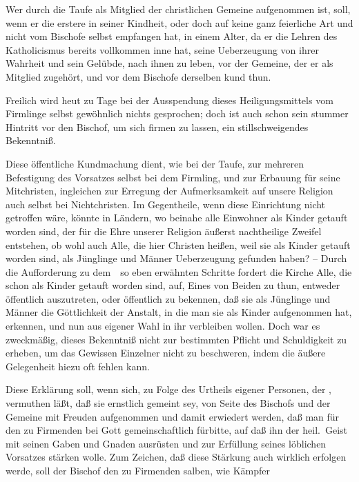 \begin{aufza}
\item Wer durch die Taufe als Mitglied der christlichen Gemeine aufgenommen ist, soll, wenn er die erstere in seiner Kindheit, oder doch auf keine ganz feierliche Art und nicht vom Bischofe selbst empfangen hat, in einem Alter, da er die Lehren des Katholicismus bereits vollkommen inne hat, seine Ueberzeugung von ihrer Wahrheit und sein Gelübde, nach ihnen zu leben, vor der Gemeine, der er als Mitglied zugehört, und vor dem Bischofe derselben kund thun.\par
{}\par
Freilich wird heut zu Tage bei der Ausspendung dieses Heiligungsmittels vom Firmlinge selbst gewöhnlich nichts gesprochen; doch ist auch schon sein stummer Hintritt vor den Bischof, um sich firmen zu lassen, ein stillschweigendes Bekenntniß.\par
{}\par
Diese öffentliche Kundmachung dient, wie bei der Taufe, zur mehreren Befestigung des Vorsatzes selbst bei dem Firmling, und zur Erbauung für seine Mitchristen, ingleichen zur Erregung der Aufmerksamkeit auf unsere Religion auch selbst bei Nichtchristen. Im Gegentheile, wenn diese Einrichtung nicht getroffen wäre, könnte in Ländern, wo beinahe alle Einwohner als Kinder getauft worden sind, der für die Ehre unserer Religion äußerst nachtheilige Zweifel entstehen, ob wohl auch Alle, die hier Christen heißen, weil sie als Kinder getauft worden sind, als Jünglinge und Männer  Ueberzeugung gefunden haben? -- Durch die Aufforderung zu dem~\ so eben erwähnten Schritte fordert die Kirche Alle, die schon als Kinder getauft worden sind, auf, Eines von Beiden zu thun, entweder öffentlich auszutreten, oder öffentlich zu bekennen, daß sie als Jünglinge und Männer die Göttlichkeit der Anstalt, in die man sie als Kinder aufgenommen hat, erkennen, und nun aus eigener Wahl in ihr verbleiben wollen. Doch war es zweckmäßig, dieses Bekenntniß nicht zur bestimmten Pflicht und Schuldigkeit zu erheben, um das Gewissen Einzelner nicht zu beschweren, indem die äußere Gelegenheit hiezu oft fehlen kann.
\item Diese Erklärung soll, wenn sich, zu Folge des Urtheils eigener Personen, der , vermuthen läßt, daß sie ernstlich gemeint sey, von Seite des Bischofs und der Gemeine mit Freuden aufgenommen und damit erwiedert werden, daß man für den zu Firmenden bei Gott gemeinschaftlich fürbitte, auf daß ihn der heil.\ Geist mit seinen Gaben und Gnaden ausrüsten und zur Erfüllung seines löblichen Vorsatzes stärken wolle. Zum Zeichen, daß diese Stärkung auch wirklich erfolgen werde, soll der Bischof den zu Firmenden salben, wie Kämpfer\RWfootnote{%
}
\end{aufza}

